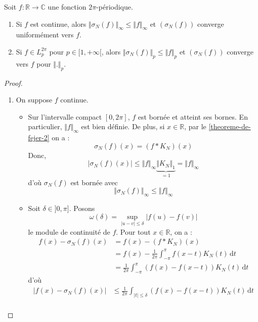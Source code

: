 
  \begin{theorem}[Fejér]
    Soit $f : \mathbb{R} \rightarrow \mathbb{C}$ une fonction $2\pi$-périodique.
    \begin{enumerate}[label=(\roman*)]
      \item Si $f$ est continue, alors $\Vert \sigma_N(f) \Vert_\infty \leq \Vert f \Vert_\infty$ et $(\sigma_N(f))$ converge uniformément vers $f$.
      \item Si $f \in L_p^{2\pi}$ pour $p \in [1,+\infty[$, alors $\Vert \sigma_N(f) \Vert_p \leq \Vert f \Vert_p$ et $(\sigma_N(f))$ converge vers $f$ pour $\Vert . \Vert_p$.
    \end{enumerate}
  \end{theorem}

  \begin{proof}
    \begin{enumerate}[label=(\roman*)]
      \item On suppose $f$ continue.
      \begin{itemize}
        \item Sur l'intervalle compact $[0, 2\pi]$, $f$ est bornée et atteint ses bornes. En particulier, $\Vert f \Vert_\infty$ est bien définie. De plus, si $x \in \mathbb{R}$, par le \cref{theoreme-de-fejer-2} on a :
        \[ \sigma_N(f)(x) = (f * K_N)(x) \]
        Donc,
        \[ \vert \sigma_N(f)(x) \vert \leq \Vert f \Vert_\infty \underbrace{\Vert K_N \Vert_1}_{=1} = \Vert f \Vert_\infty \]
        d'où $\sigma_N(f)$ est bornée avec
        \[ \Vert \sigma_N(f) \Vert_\infty \leq \Vert f \Vert_\infty \]
        \item Soit $\delta \in ]0,\pi]$. Posons
        \[ \omega(\delta) = \sup_{\vert u - v \vert \leq \delta} \vert f(u) - f(v) \vert \]
        le module de continuité de $f$. Pour tout $x \in \mathbb{R}$, on a :
        \begin{align*}
          f(x) - \sigma_N(f)(x) &= f(x) - (f * K_N)(x) \\
          &= f(x) - \frac{1}{2\pi} \int_{-\pi}^{\pi} f(x-t) K_N(t) \, \mathrm{d}t \\
          &= \frac{1}{2\pi} \int_{-\pi}^{\pi} (f(x) - f(x-t)) K_N(t) \, \mathrm{d}t \tag{*}
        \end{align*}
        d'où
        \begin{align*}
          \vert f(x) - \sigma_N(f)(x) \vert &\leq \frac{1}{2\pi} \int_{\vert t \vert \leq \delta} (f(x) - f(x-t)) K_N(t) \, \mathrm{d}t \\

\end{align*}
\end{itemize}
\end{enumerate}
\end{proof}
